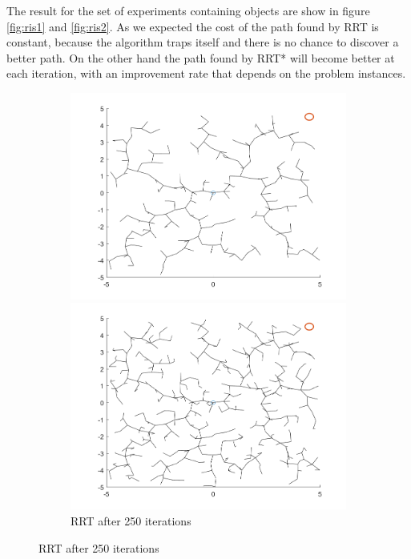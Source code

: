 \documentclass[10pt]{article}
\begin{document}
	The result for the set of experiments containing objects are show in figure \ref{fig:ris1} and \ref{fig:ris2}. As we expected the cost of the path found by RRT is constant, because the algorithm traps itself and there is no chance to discover a better path. On the other hand the path found by RRT* will become better at each iteration, with an improvement rate that depends on the problem instances.
\begin{figure}[!hbt]
	
	\begin{subfigure}{\textwidth}
		\centering
		\begin{minipage}[b]{0.32\linewidth}
		\includegraphics[width=\linewidth]{empty_RTT_250_dist_0}
		\caption{RRT after 250 iterations}
	\end{minipage}
		\begin{minipage}[b]{0.32\linewidth}
		\includegraphics[width=\linewidth]{empty_RTT_500_dist_0}

\end{minipage}
\end{subfigure}
\end{figure}
\end{document}
